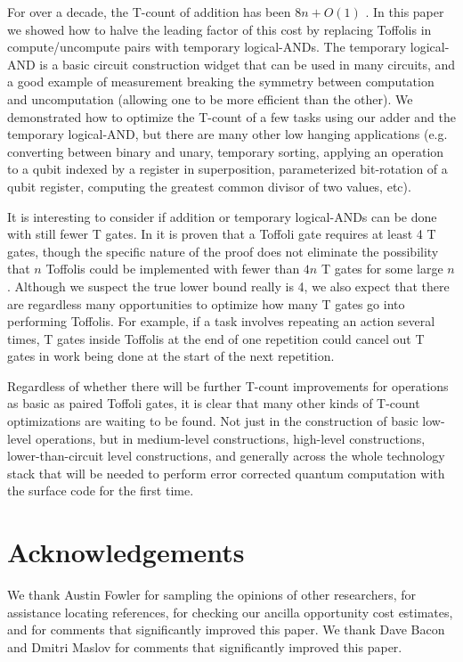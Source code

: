 \documentclass[twocolumn]{quantumarticle-customized}
\begin{document}
For over a decade, the T-count of addition has been $8n + O(1)$ \cite{Amy2013, Barenco1995, Cuccaro2004}.
In this paper we showed how to halve the leading factor of this cost by replacing Toffolis in compute/uncompute pairs with temporary logical-ANDs.
The temporary logical-AND is a basic circuit construction widget that can be used in many circuits, and a good example of measurement breaking the symmetry between computation and uncomputation (allowing one to be more efficient than the other).
We demonstrated how to optimize the T-count of a few tasks using our adder and the temporary logical-AND, but there are many other low hanging applications (e.g. converting between binary and unary, temporary sorting, applying an operation to a qubit indexed by a register in superposition, parameterized bit-rotation of a qubit register, computing the greatest common divisor of two values, etc).

It is interesting to consider if addition or temporary logical-ANDs can be done with still fewer T gates.
In \cite{Howard2017} it is proven that a Toffoli gate requires at least 4 T gates, though the specific nature of the proof does not eliminate the possibility that $n$ Toffolis could be implemented with fewer than $4n$ T gates for some large $n$.
Although we suspect the true lower bound really is 4, we also expect that there are regardless many opportunities to optimize how many T gates go into performing Toffolis.
For example, if a task involves repeating an action several times, T gates inside Toffolis at the end of one repetition could cancel out T gates in work being done at the start of the next repetition.

Regardless of whether there will be further T-count improvements for operations as basic as paired Toffoli gates, it is clear that many other kinds of T-count optimizations are waiting to be found.
Not just in the construction of basic low-level operations, but in medium-level constructions, high-level constructions, lower-than-circuit level constructions, and generally across the whole technology stack that will be needed to perform error corrected quantum computation with the surface code for the first time.


\section*{Acknowledgements}

We thank Austin Fowler for sampling the opinions of other researchers, for assistance locating references, for checking our ancilla opportunity cost estimates, and for comments that significantly improved this paper.
We thank Dave Bacon and Dmitri Maslov for comments that significantly improved this paper.



\end{document}
